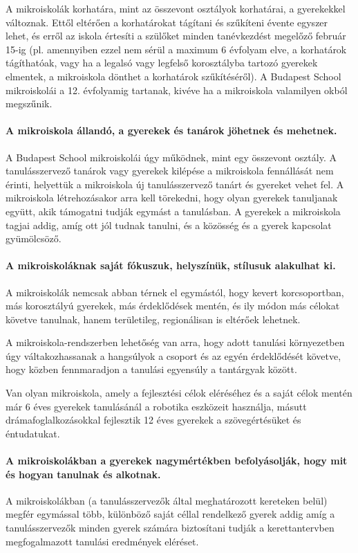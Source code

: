 A mikroiskolák korhatára, mint az összevont osztályok korhatárai, a gyerekekkel
változnak. Ettől eltérően a korhatárokat tágítani és szűkíteni évente egyszer
lehet, és
erről az iskola értesíti a szülőket minden tanévkezdést megelőző február 15-ig
(pl. amennyiben ezzel nem sérül a maximum 6 évfolyam elve, a korhatárok
tágíthatóak, vagy ha a legalsó vagy legfelső korosztályba tartozó gyerekek
elmentek, a mikroiskola dönthet a korhatárok szűkítéséről).
A Budapest School mikroiskolái a 12. évfolyamig tartanak, kivéve ha a
mikroiskola valamilyen okból megszűnik.

\paragraph{A mikroiskola állandó, a gyerekek és tanárok jöhetnek és mehetnek.}
A Budapest School mikroiskolái úgy működnek, mint egy összevont osztály. A
tanulásszervező tanárok vagy gyerekek kilépése a mikroiskola fennállását nem
érinti, helyettük a mikroiskola új tanulásszervező tanárt és
gyereket vehet fel.  A mikroiskola létrehozásakor arra kell törekedni, hogy
olyan
gyerekek tanuljanak együtt, akik támogatni tudják egymást a tanulásban. A
gyerekek a mikroiskola tagjai addig, amíg ott jól tudnak tanulni, és a közösség
és a gyerek kapcsolat gyümölcsöző.

\paragraph{A mikroiskoláknak saját fókuszuk, helyszínük, stílusuk alakulhat
      ki.}
A mikroiskolák nemcsak abban térnek el egymástól, hogy kevert korcsoportban,
más korosztályú gyerekek, más érdeklődések mentén, és ily módon más célokat
követve tanulnak, hanem területileg, regionálisan is eltérőek lehetnek.

A mikroiskola-rendszerben lehetőség van arra, hogy adott tanulási környezetben
úgy váltakozhassanak a hangsúlyok a csoport és az egyén érdeklődését követve,
hogy közben
fennmaradjon a tanulási egyensúly a tantárgyak között.

Van olyan mikroiskola, amely a fejlesztési célok eléréséhez és a saját célok
mentén már 6 éves gyerekek tanulásánál a robotika eszközeit használja, másutt
drámafoglalkozásokkal fejlesztik 12 éves gyerekek a szövegértésüket és
éntudatukat.

\paragraph{A mikroiskolákban a gyerekek nagymértékben befolyásolják, hogy mit és
      hogyan
      tanulnak és alkotnak.}
A mikroiskolákban (a tanulásszervezők által meghatározott kereteken belül)
megfér egymással több, különböző saját céllal rendelkező gyerek addig amíg a
tanulásszervezők minden gyerek számára biztosítani tudják a kerettantervben
megfogalmazott tanulási eredmények eléréset.

